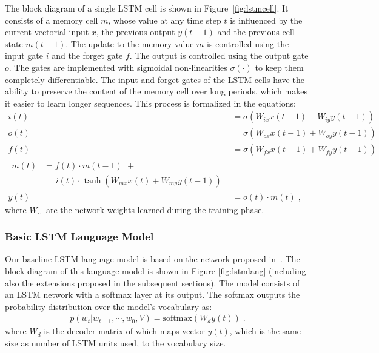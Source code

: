 The block diagram of a single LSTM cell is shown in
Figure~\ref{fig:lstmcell}.  
It consists of a memory cell $m$, whose value at any time step $t$ is
influenced by the current vectorial input $x$, the previous output
$y(t-1)$ and the previous cell state $m(t-1)$.
The update to the memory value $m$ is controlled using the input gate
$i$ and the forget gate $f$.
The output is controlled using the output gate $o$. 
The gates are implemented with sigmoidal non-linearities
$\sigma(\cdot)$ to keep them completely differentiable.
The input and forget gates of the LSTM cells have the ability to
preserve the content of the memory cell over long periods, which makes
it easier to learn longer sequences.
This process is formalized in the equations:
\begin{align}
  \label{eqn:lstmstrt}
  i(t) &= \sigma(W_{ix}x(t-1) + W_{iy}y(t-1))\\
  o(t) &= \sigma(W_{ox}x(t-1) + W_{oy}y(t-1))\\
  f(t) &= \sigma(W_{fx}x(t-1) + W_{fy}y(t-1))\\
  \label{eqn:lstmend}
  \begin{split}
    m(t) &= f(t)\cdot m(t-1) \:\, + \\
    &\; \; \; \; \; i(t)\cdot \tanh(W_{mx}x(t)+W_{my}y(t-1))
  \end{split}\\
  y(t) &= o(t) \cdot m(t) \;,
\end{align}
where $W_{\cdot\cdot}$ are the network weights learned during the
training phase.


\subsubsection{Basic LSTM Language Model}
\label{subsec:basiclstmodel}

Our baseline LSTM language model is based on the network proposed
in~\cite{Vinyals_2015_CVPR}.
The block diagram of this language model is shown in Figure
\ref{fig:lstmlang} (including also the extensions proposed in
the subsequent sections).
The model consists of an LSTM network with a softmax layer at its
output. 
The softmax outputs the probability distribution over the model's
vocabulary as:
\begin{align}
p(w_t | w_{t-1},\cdots,w_0, V) = \text{softmax}(W_d y(t)) \;.
\end{align}
\noindent where $W_d$ is the decoder matrix of which maps vector $y(t)$, which
is the same size as number of LSTM units used, to the vocabulary size.

